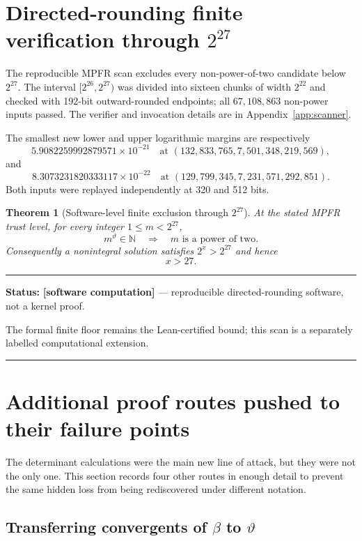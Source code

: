 \documentclass[11pt,oneside]{article}
\newtheorem{theorem}{Theorem}[section]
\theoremstyle{definition}
\theoremstyle{remark}
\newcommand{\N}{\mathbb N}
\newcommand{\statuscomp}{\textcolor{computeviolet}{\textbf{[software computation]}}}
\newenvironment{statusbox}[1]
{\begin{center}\begin{minipage}{0.94\textwidth}\raggedright\hbadness=10000\hrule
\vspace{0.45em}\textbf{Status:} #1\par\vspace{0.35em}}
{\vspace{0.35em}\hrule\end{minipage}\end{center}}
\begin{document}
\section{Directed-rounding finite verification through \texorpdfstring{$2^{27}$}{2\^{}27}}
\label{sec:finite27}

The reproducible MPFR scan excludes every non-power-of-two candidate below $2^{27}$.
The interval $[2^{26},2^{27})$ was divided into sixteen chunks of width $2^{22}$ and
checked with 192-bit outward-rounded endpoints; all $67{,}108{,}863$ non-power inputs
passed.  The verifier and invocation details are in Appendix~\ref{app:scanner}.

The smallest new lower and upper logarithmic margins are respectively
\[
5.9082259992879571\times10^{-21}
\quad\text{at }(132{,}833{,}765,7{,}501{,}348{,}219{,}569),
\]
and
\[
8.3073231820333117\times10^{-22}
\quad\text{at }(129{,}799{,}345,7{,}231{,}571{,}292{,}851).
\]
Both inputs were replayed independently at 320 and 512 bits.

\begin{theorem}[Software-level finite exclusion through $2^{27}$]
\label{thm:finite27}
At the stated MPFR trust level, for every integer $1\le m<2^{27}$,
\[
 m^{\vartheta}\in\N
 \quad\Longrightarrow\quad
 m\text{ is a power of two}.
\]
Consequently a nonintegral solution satisfies $2^x>2^{27}$ and hence
\begin{equation}\label{eq:x-gt-27}
 x>27.
\end{equation}
\end{theorem}

\begin{statusbox}{\statuscomp{} --- reproducible directed-rounding software, not a
kernel proof.}
The formal finite floor remains the Lean-certified bound; this scan is a separately
labelled computational extension.
\end{statusbox}

\section{Additional proof routes pushed to their failure points}
\label{ct:attempts}

The determinant calculations were the main new line of attack, but they were not the only one.
This section records four other routes in enough detail to prevent the same hidden loss from
being rediscovered under different notation.

\subsection{Transferring convergents of \texorpdfstring{$\beta$}{beta} to
\texorpdfstring{$\vartheta$}{theta}}
\label{subsec:transfer}
\end{document}
